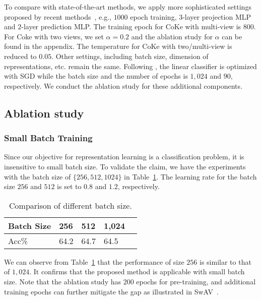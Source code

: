 \documentclass[10pt,twocolumn,letterpaper]{article}
\begin{document}
To compare with state-of-the-art methods, we apply more sophisticated settings proposed by recent methods~\cite{GrillSATRBDPGAP20, ChenKSNH20}, e.g., $1000$ epoch training, $3$-layer projection MLP and $2$-layer prediction MLP. The training epoch for CoKe with multi-view is $800$. For Coke with two views, we set $\alpha=0.2$ and the ablation study for $\alpha$ can be found in the appendix. The temperature for CoKe with two/multi-view is reduced to $0.05$. Other settings, including batch size, dimension of representations, etc. remain the same. Following \cite{abs-2104-02057}, the linear classifier is optimized with SGD while the batch size and the number of epochs is $1,024$ and $90$, respectively. We conduct the ablation study for these additional components.


\subsection{Ablation study}
\subsubsection{Small Batch Training}
Since our objective for representation learning is a classification problem, it is insensitive to small batch size. To validate the claim, we have the experiments with the batch size of $\{256, 512, 1024\}$ in Table~\ref{tas:bs}. The learning rate for the batch size $256$ and $512$ is set to $0.8$ and $1.2$, respectively.
\begin{table}[!ht]
\centering
\begin{tabular}{|l|l|l|l|l|}\hline
Batch Size&256&512&1,024\\\hline
Acc\% &64.2&64.7&64.5 \\\hline
\end{tabular}
\caption{Comparison of different batch size.}\label{tas:bs}
\end{table}
We can observe from Table~\ref{tas:bs} that the performance of size $256$ is similar to that of $1,024$. It confirms that the proposed method is applicable with small batch size. Note that the ablation study has $200$ epochs for pre-training, and additional training epochs can further mitigate the gap as illustrated in SwAV~\cite{CaronMMGBJ20}.
\end{document}
